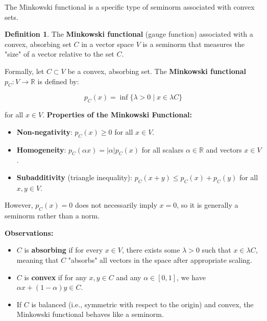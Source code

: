 \documentclass[12pt, reqno]{amsart}
\theoremstyle{definition}
\newtheorem{definition}[theorem]{Definition}
\numberwithin{equation}{section}
\newcommand{\dR}{{\mathbb R}}
\begin{document}
The Minkowski functional is a specific type of seminorm associated with convex sets.

\begin{definition}
The \textbf{Minkowski functional} (gauge function) associated with a convex, absorbing set $C$ in a vector space $V$ is a seminorm that measures the "size" of a vector relative to the set $C$.

Formally, let $C \subset V$ be a convex, absorbing set. The \textbf{Minkowski functional} $p_C: V \to \dR$ is defined by:

\[
p_C(x) = \inf \{ \lambda > 0 \mid x \in \lambda C \}
\]

for all $x \in V$.
\textbf{Properties of the Minkowski Functional:}
\begin{itemize}
    \item \textbf{Non-negativity}: $p_C(x) \geq 0$ for all $x \in V$.
    \item \textbf{Homogeneity}: $p_C(\alpha x) = |\alpha| p_C(x)$ for all scalars $\alpha \in \dR$ and vectors $x \in V$.
    \item \textbf{Subadditivity} (triangle inequality): $p_C(x + y) \leq p_C(x) + p_C(y)$ for all $x, y \in V$.
\end{itemize}

However, $p_C(x) = 0$ does not necessarily imply $x = 0$, so it is generally a seminorm rather than a norm.
\end{definition}

\textbf{Observations:}
\begin{itemize}
    \item $C$ is \textbf{absorbing} if for every $x \in V$, there exists some $\lambda > 0$ such that $x \in \lambda C$, meaning that $C$ "absorbs" all vectors in the space after appropriate scaling.
    \item $C$ is \textbf{convex} if for any $x, y \in C$ and any $\alpha \in [0, 1]$, we have $\alpha x + (1-\alpha) y \in C$.
    \item If $C$ is balanced (i.e., symmetric with respect to the origin) and convex, the Minkowski functional behaves like a seminorm.
\end{itemize}
\end{document}
